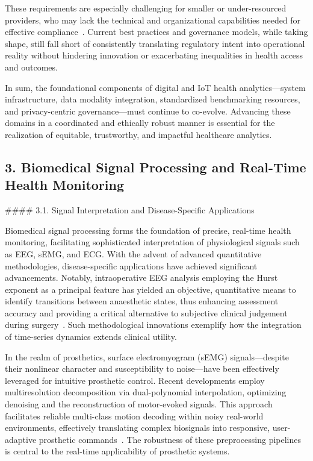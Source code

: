 \documentclass[11pt]{article}
\begin{document}
These requirements are especially challenging for smaller or under-resourced providers, who may lack the technical and organizational capabilities needed for effective compliance~\cite{ref82, ref84, ref106}. Current best practices and governance models, while taking shape, still fall short of consistently translating regulatory intent into operational reality without hindering innovation or exacerbating inequalities in health access and outcomes.

In sum, the foundational components of digital and IoT health analytics—system infrastructure, data modality integration, standardized benchmarking resources, and privacy-centric governance—must continue to co-evolve. Advancing these domains in a coordinated and ethically robust manner is essential for the realization of equitable, trustworthy, and impactful healthcare analytics.

\subsection{3. Biomedical Signal Processing and Real-Time Health Monitoring}

#### 3.1. Signal Interpretation and Disease-Specific Applications

Biomedical signal processing forms the foundation of precise, real-time health monitoring, facilitating sophisticated interpretation of physiological signals such as EEG, sEMG, and ECG. With the advent of advanced quantitative methodologies, disease-specific applications have achieved significant advancements. Notably, intraoperative EEG analysis employing the Hurst exponent as a principal feature has yielded an objective, quantitative means to identify transitions between anaesthetic states, thus enhancing assessment accuracy and providing a critical alternative to subjective clinical judgement during surgery~\cite{ref96}. Such methodological innovations exemplify how the integration of time-series dynamics extends clinical utility.

In the realm of prosthetics, surface electromyogram (sEMG) signals—despite their nonlinear character and susceptibility to noise—have been effectively leveraged for intuitive prosthetic control. Recent developments employ multiresolution decomposition via dual-polynomial interpolation, optimizing denoising and the reconstruction of motor-evoked signals. This approach facilitates reliable multi-class motion decoding within noisy real-world environments, effectively translating complex biosignals into responsive, user-adaptive prosthetic commands~\cite{ref97}. The robustness of these preprocessing pipelines is central to the real-time applicability of prosthetic systems.
\end{document}
